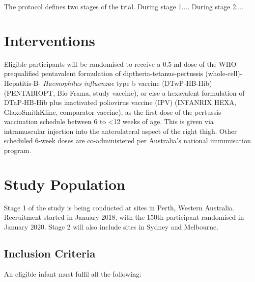 \documentclass{bmcart}
\begin{document}
The protocol defines two stages of the trial.
During stage 1....
During stage 2....

\section*{Interventions}

Eligible participants will be randomised to receive a 0.5 ml dose of the WHO-prequalified pentavalent formulation of diptheria-tetanus-pertussis (whole-cell)-Hepatitis-B- \textit{Haemophilus influenzae} type b vaccine (DTwP-HB-Hib) (PENTABIO\textregistered PT, Bio Frama, study vaccine), or else a hexavalent formulation of DTaP-HB-Hib plus inactivated poliovirus vaccine (IPV) (INFANRIX HEXA\textregistered, GlaxoSmithKline, comparator vaccine), as the first dose of the pertussis vaccination schedule between 6 to \textless 12 weeks of age.
This is given via intramuscular injection into the anterolateral aspect of the right thigh.
Other scheduled 6-week doses are co-administered per Australia's national immunisation program.

\section*{Study Population}

Stage 1 of the study is being conducted at sites in Perth, Western Australia.
Recruitment started in January 2018, with the 150th participant randomised in January 2020.
Stage 2 will also include sites in Sydney and Melbourne.

\subsection*{Inclusion Criteria}

An eligible infant must fulfil all the following:
\end{document}
